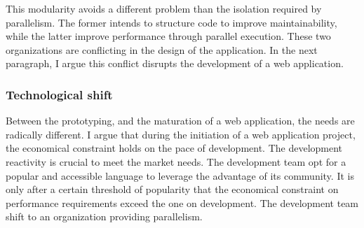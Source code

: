 This modularity avoids a different problem than the isolation required by parallelism.
The former intends to structure code to improve maintainability, while the latter improve performance through parallel execution.
These two organizations are conflicting in the design of the application.
In the next paragraph, I argue this conflict disrupts the development of a web application.



\subsubsection{Technological shift}

Between the prototyping, and the maturation of a web application, the needs are radically different.
I argue that during the initiation of a web application project, the economical constraint holds on the pace of development.
The development reactivity is crucial to meet the market needs.
The development team opt for a popular and accessible language to leverage the advantage of its community.
It is only after a certain threshold of popularity that the  economical constraint on performance requirements exceed the one on development.
The development team shift to an organization providing parallelism.


